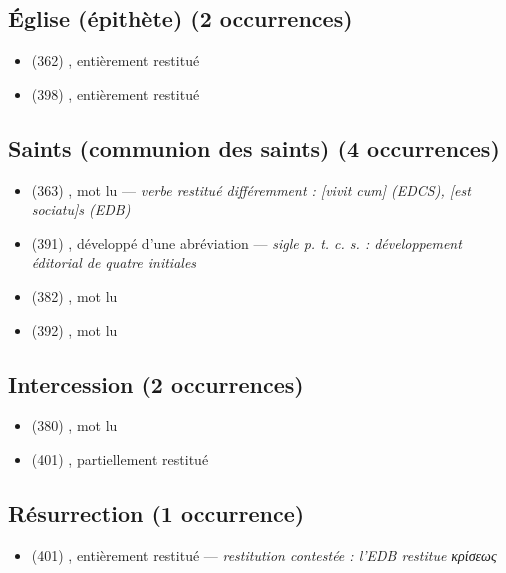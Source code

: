 \subsection*{Église (épithète) (2 occurrences)}
\begin{itemize}[leftmargin=1.2em,itemsep=0pt]
\item {} (362) , entièrement restitué
\item {} (398) , entièrement restitué
\end{itemize}
\subsection*{Saints (communion des saints) (4 occurrences)}
\begin{itemize}[leftmargin=1.2em,itemsep=0pt]
\item {} (363) , mot lu — \textit{verbe restitué différemment : [vivit cum] (EDCS), [est sociatu]s (EDB)}
\item {} (391) , développé d’une abréviation — \textit{sigle p. t. c. s. : développement éditorial de quatre initiales}
\item {} (382) , mot lu
\item {} (392) , mot lu
\end{itemize}
\subsection*{Intercession (2 occurrences)}
\begin{itemize}[leftmargin=1.2em,itemsep=0pt]
\item {} (380) , mot lu
\item {} (401) , partiellement restitué
\end{itemize}
\subsection*{Résurrection (1 occurrence)}
\begin{itemize}[leftmargin=1.2em,itemsep=0pt]
\item {} (401) , entièrement restitué — \textit{restitution contestée : l’EDB restitue κρίσεως}
\end{itemize}
